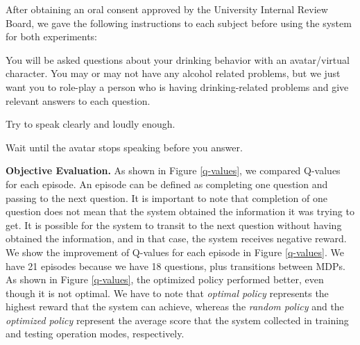 \documentclass[letterpaper]{article}
\begin{document}
\begin{inparaenum}[1)]
After obtaining an oral consent approved by the University Internal Review Board, we gave the following instructions to each subject before using the system for both experiments:
\vspace{-0 mm}
\begin{compactitem}
\item You will be asked questions about your drinking behavior with an avatar/virtual character.  You may or may not have any alcohol related problems, but we just want you to role-play a person who is having drinking-related problems and give relevant answers to each question.
\vspace{-0 mm}
\item Try to speak clearly and loudly enough.
\vspace{-0 mm}
\item Wait until the avatar stops speaking before you answer.
\end{compactitem} 


{\bf Objective Evaluation.}  
As shown in Figure \ref{q-values}, we compared Q-values for each episode. An episode can be defined as completing one question and passing to the next question. It is important to note that completion of one question does not mean that the system obtained the information it was trying to get. It is possible for the system to transit to the next question without having obtained the information, and in that case, the system receives negative reward. 
We show the improvement of Q-values for each episode in Figure \ref{q-values}. We have  21 episodes because we have 18 questions, plus transitions between MDPs. As shown in Figure \ref{q-values}, the optimized policy performed better, even though it is not optimal. We have to note that \textit{optimal policy} represents the highest reward that the system can achieve, whereas the \textit{random policy} and the \textit{optimized policy} represent the average score that the system collected in training and testing operation modes, respectively.\\


\end{inparaenum}
\end{document}
